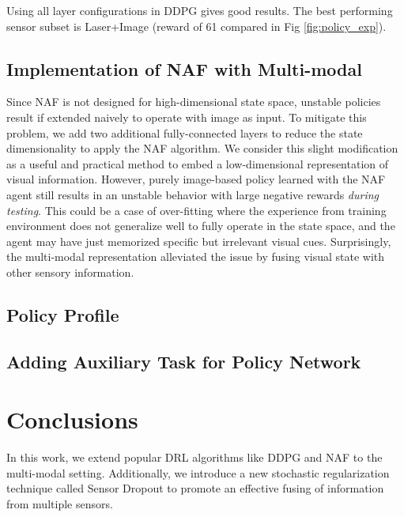\documentclass[../thesis.tex]{subfiles}
\begin{document}
Using all layer configurations in DDPG gives good results.  The best performing sensor subset is Laser+Image (reward of 61 compared in Fig \ref{fig:policy_exp}). 

\subsection{Implementation of NAF with Multi-modal} \label{discussion-NAF}
Since NAF is not designed for high-dimensional state space, unstable policies result if extended naively to operate with image as input. To mitigate this problem, we add two additional fully-connected layers to reduce the state dimensionality to apply the NAF algorithm. We consider this slight modification as a useful and practical method to embed a low-dimensional representation of visual information. However, purely image-based policy learned with the NAF agent still results in an unstable behavior with large negative rewards \emph{during testing}. This could be a case of over-fitting where the experience from training environment does not generalize well to fully operate in the state space, and the agent may have just memorized specific but irrelevant visual cues. Surprisingly, the multi-modal representation alleviated the issue by fusing visual state with other sensory information. 

\subsection{Policy Profile}

\subsection{Adding Auxiliary Task for Policy Network}

\cite{lample2016playing}
\cite{dosovitskiy2016learning}

\section{Conclusions}
In this work, we extend popular DRL algorithms like DDPG and NAF to the multi-modal setting. Additionally, we introduce a new stochastic regularization technique called Sensor Dropout to promote an effective fusing of information from multiple sensors. 
\end{document}
